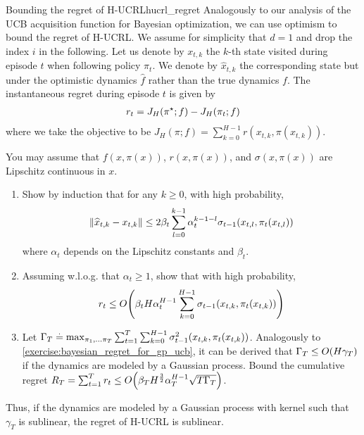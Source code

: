 \begin{nexercise}{Bounding the regret of H-UCRL}{hucrl_regret}
  Analogously to our analysis of the UCB acquisition function for Bayesian optimization, we can use optimism to bound the regret of H-UCRL.
  We assume for simplicity that $d = 1$ and drop the index $i$ in the following.
  Let us denote by $x_{t,k}$ the $k$-th state visited during episode $t$ when following policy $\pi_t$.
  We denote by $\widehat{x}_{t,k}$ the corresponding state but under the optimistic dynamics $\widehat{f}$ rather than the true dynamics $f$.
  The instantaneous regret during episode $t$ is given by \begin{align}
    r_t = J_H(\pi^\star; f) - J_H(\pi_t; f)
  \end{align} where we take the objective to be $J_H(\pi; f) = \sum_{k=0}^{H-1} r(x_{t,k}, \pi(x_{t,k}))$.

  You may assume that $f(x, \pi(x))$, $r(x, \pi(x))$, and $\sigma(x, \pi(x))$ are Lipschitz continuous in $x$.
  \begin{enumerate}
    \item Show by induction that for any $k \geq 0$, with high probability, \begin{align}
      \norm{\widehat{x}_{t,k} - x_{t,k}} \leq 2 \beta_t \sum_{l=0}^{k-1} \alpha_t^{k-1-l} \sigma_{t-1}(x_{t,l}, \pi_t(x_{t,l})) \label{eq:hucrl_regret:induction}
    \end{align} where $\alpha_t$ depends on the Lipschitz constants and $\beta_t$.

    \item Assuming w.l.o.g. that $\alpha_t \geq 1$, show that with high probability, \begin{align}
      r_t \leq \BigO{\beta_t H \alpha_t^{H-1} \sum_{k=0}^{H-1} \sigma_{t-1}(x_{t,k}, \pi_t(x_{t,k}))}
    \end{align}

    \item Let $\Gamma_T \overset{.}{=} \max_{\pi_1, \dots \pi_T} \sum_{t=1}^T \sum_{k=0}^{H-1} \sigma_{t-1}^2(x_{t,k}, \pi_t(x_{t,k}))$.
    Analogously to \cref{exercise:bayesian_regret_for_gp_ucb}, it can be derived that $\Gamma_T \leq \BigO{H \gamma_T}$ if the dynamics are modeled by a Gaussian process.
    Bound the cumulative regret $R_T = \sum_{t=1}^T r_t \leq \BigO{\beta_{T} H^{\frac{3}{2}} \alpha_T^{H-1} \sqrt{T \Gamma_T}}$.
  \end{enumerate}
  Thus, if the dynamics are modeled by a Gaussian process with kernel such that $\gamma_T$ is sublinear, the regret of H-UCRL is sublinear.
\end{nexercise}
